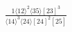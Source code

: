 \documentclass[varwidth, border=5pt]{standalone}
\begin{document}
\begin{my}
$\begin{gathered}
\scriptscriptstyle\frac{1⟨12⟩^2⟨35⟩[23]^3}{⟨14⟩^3⟨24⟩[24]^2[25]}
\end{gathered}$
\end{my}
\end{document}
